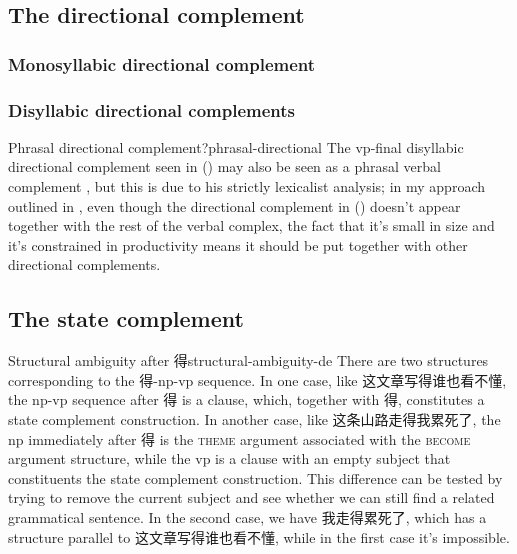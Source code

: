 \documentclass[UTF8, a4paper, oneside, scheme=plain]{ctexrep}
\newcommand*{\citepage}[1]{p.~{#1}}
\newcommand*{\category}[1]{\textsc{#1}}
\begin{document}
\subsection{The directional complement}

\subsubsection{Monosyllabic directional complement}

\subsubsection{Disyllabic directional complements}

\begin{infobox}{Phrasal directional complement?}{phrasal-directional}
    The \acs{vp}-final disyllabic directional complement seen in 
    ()
    may also be seen as a phrasal verbal complement 
    \citep[\citepage{120}]{deng2010formal}, 
    but this is due to his strictly lexicalist analysis; 
    in my approach outlined in , 
    even though the directional complement in  
    ()
    doesn't appear together with the rest of the verbal complex, 
    the fact that it's small in size and  
    it's constrained in productivity
    means it should be put together with other directional complements. 
\end{infobox}

\subsection{The state complement}



\begin{infobox}{Structural ambiguity after 得}{structural-ambiguity-de}
    There are two structures corresponding to the 得-\acs{np}-\acs{vp} sequence.
    In one case, like 这文章写得谁也看不懂, the \acs{np}-\acs{vp} sequence after 得 is a clause, 
    which, together with 得, constitutes 
    a state complement construction.
    In another case, like 这条山路走得我累死了, 
    the \acs{np} immediately after 得 
    is the \category{theme} argument associated with the \category{become} argument structure, 
    while the \acs{vp} is a clause with an empty subject 
    that constituents the state complement construction.
    This difference can be tested by trying to remove the current subject 
    and see whether we can still find a related grammatical sentence. 
    In the second case, we have 我走得累死了, 
    which has a structure parallel to 这文章写得谁也看不懂, 
    while in the first case it's impossible. 
\end{infobox}
\end{document}
